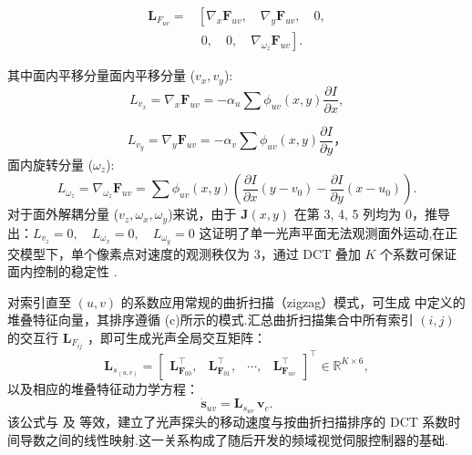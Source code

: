 \documentclass{article}
\begin{document}
\begin{equation} \label{eq:LFuv_explicit}
\begin{aligned}
	\boldsymbol{L}_{F_{uv}} = 
	&\left[
		\nabla_x \boldsymbol{F}_{uv}, \quad 
		\nabla_y \boldsymbol{F}_{uv}, \quad  
		0, \right. \\
	&\left.\;
		0, \quad  
		0, \quad  
		\nabla_{\omega_z} \boldsymbol{F}_{uv}
	\right].
\end{aligned}
\end{equation}

其中面内平移分量面内平移分量 ($v_x, v_y$):
\begin{equation} 
L_{v_x} =\nabla_x \boldsymbol{F}_{uv}= -\alpha_u \sum \phi_{uv}(x,y) \frac{\partial I}{\partial x},
\end{equation} 

\begin{equation} 
L_{v_y} = \nabla_y \boldsymbol{F}_{uv}=-\alpha_v \sum \phi_{uv}(x,y) \frac{\partial I}{\partial y}，
\end{equation} 
面内旋转分量 ($\omega_z$):
\begin{equation} 
L_{\omega_z} = \nabla_{\omega_z} \boldsymbol{F}_{uv}=\sum \phi_{uv}(x,y) \left( \frac{\partial I}{\partial x}(y - v_0)
- \frac{\partial I}{\partial y}(x - u_0) \right).
\end{equation} 
对于面外解耦分量 ($v_z, \omega_x, \omega_y$)来说，由于 $\mathbf{J}(x,y)$ 在第 3, 4, 5 列均为 0，推导出：$L_{v_z} = 0, \quad L_{\omega_x} = 0, \quad L_{\omega_y} = 0$ 这证明了单一光声平面无法观测面外运动,在正交模型下，单个像素点对速度的观测秩仅为 3，通过 DCT 叠加 $K$ 个系数可保证面内控制的稳定性 .

对索引直至 $(u,v)$ 的系数应用常规的曲折扫描（zigzag）模式，可生成  中定义的堆叠特征向量，其排序遵循 (c)所示的模式.汇总曲折扫描集合中所有索引 $(i,j)$ 的交互行 $\boldsymbol{L}_{F_{ij}}$ ，即可生成光声全局交互矩阵：
\begin{equation}
\boldsymbol{L}_{s_{(u,v)}} = 
\begin{bmatrix}
\boldsymbol{L}_{\boldsymbol{F}_{00}}^\top, & 
\boldsymbol{L}_{\boldsymbol{F}_{01}}^\top, & 
\cdots, & 
\boldsymbol{L}_{\boldsymbol{F}_{uv}}^\top
\end{bmatrix}^\top \in \mathbb{R}^{K \times 6},
\label{eq:Lsuvmat}
\end{equation}
以及相应的堆叠特征动力学方程：
\begin{equation}
\dot{\mathbf{s}}_{uv} = \boldsymbol{L}_{s_{uv}} \, \mathbf{v}_c.
\end{equation}
该公式与  及  等效，建立了光声探头的移动速度与按曲折扫描排序的 DCT 系数时间导数之间的线性映射.这一关系构成了随后开发的频域视觉伺服控制器的基础.
\end{document}
